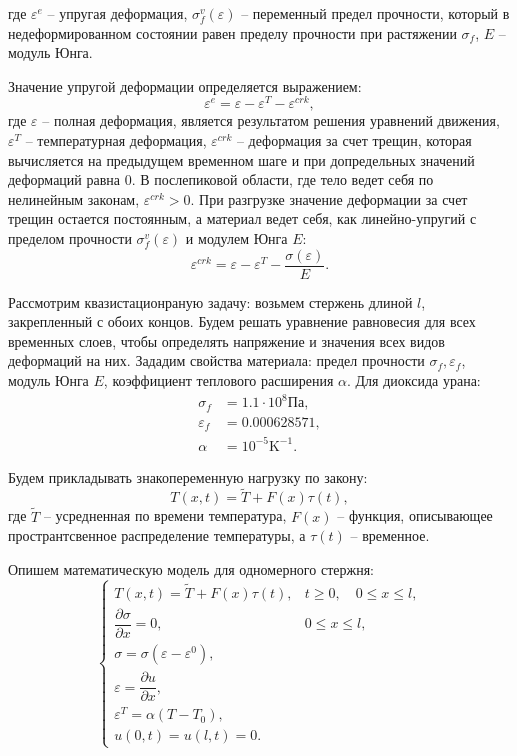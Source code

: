 \documentclass[12pt,a4paper]{article}
\begin{document}
  \noindent где $\varepsilon^e$ -- упругая деформация, $\sigma_f^v(\varepsilon)$ -- переменный предел прочности, который в недеформированном состоянии равен пределу прочности при растяжении $\sigma_f$, $E$ -- модуль Юнга.

  Значение упругой деформации определяется выражением:
  \[
    \varepsilon^e = \varepsilon - \varepsilon^T - \varepsilon^{crk},
  \]
  \noindent где 
  $\varepsilon$ -- полная деформация, является результатом решения уравнений движения, $\varepsilon^T$ -- температурная деформация, $\varepsilon^{crk}$ -- деформация за счет трещин, которая вычисляется на предыдущем временном шаге и при допредельных значений деформаций равна $0$. В послепиковой области, где тело ведет себя по нелинейным законам, $\varepsilon^{crk} > 0$. При разгрузке значение деформации за счет трещин остается постоянным, а материал ведет себя, как линейно-упругий с пределом прочности $\sigma_f^v(\varepsilon)$ и модулем Юнга $E\colon$
  \[
    \varepsilon^{crk} = \varepsilon - \varepsilon^T - \dfrac{\sigma(\varepsilon)}{E}.
  \] 

  Рассмотрим квазистационраную задачу: возьмем стержень длиной $l$, закрепленный с обоих концов. Будем решать уравнение равновесия для всех временных слоев, чтобы определять напряжение и значения всех видов деформаций на них. Зададим свойства материала: предел прочности $\sigma_f, \varepsilon_f$, модуль Юнга $E$, коэффициент теплового расширения $\alpha$. Для диоксида урана:
  \[
    \begin{split}
      \sigma_f &= 1.1 \cdot 10^8 \text{Па}, \\
      \varepsilon_f &= 0.000628571, \\
      \alpha &= 10^{-5} \text{K}^{-1}.
    \end{split}
  \]

  Будем прикладывать знакопеременную нагрузку по закону:
  \[
    T(x, t) = \widetilde{T} + F(x) \tau(t),
  \]
  \noindent где $\widetilde{T}$ -- усредненная по времени температура, $F(x)$ -- функция, описывающее пространтсвенное распределение температуры, а $\tau(t)$ -- временное.

  Опишем математическую модель для одномерного стержня:
  \begin{equation}
    \begin{cases}
      T(x, t) = \widetilde{T} + F(x) \tau(t), & t \geq 0, \quad 0 \leq x \leq l, \\[0.7em]
      \dfrac{\partial \sigma}{\partial x} = 0, & 0 \leq x \leq l, \\[0.7em]
      \sigma = \sigma(\varepsilon - \varepsilon^0), \\[0.7em]
      \varepsilon = \dfrac{\partial u}{\partial x}, \\[0.7em]
      \varepsilon^T = \alpha(T - T_0), \\[0.7em]
      u(0, t) = u(l, t) = 0.
    \end{cases}
    \label{model}
  \end{equation}
\end{document}

